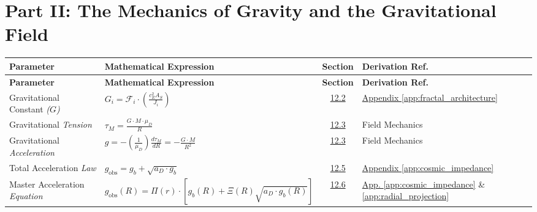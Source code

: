 \vspace{1cm} %

\section*{Part II: The Mechanics of Gravity and the Gravitational Field}

\vspace{0.5cm}
\noindent
\renewcommand{\arraystretch}{1.6}
\begin{longtable}{@{} p{4.5cm} p{6cm} c p{4cm} @{}}
\toprule
\textbf{Parameter} & \textbf{Mathematical Expression} & \textbf{Section} & \textbf{Derivation Ref.} \\
\midrule
\endfirsthead

\toprule
\textbf{Parameter} & \textbf{Mathematical Expression} & \textbf{Section} & \textbf{Derivation Ref.} \\
\midrule
\endhead

Gravitational Constant \newline \textit{($G$)} & $G_i = \mathcal{F}_i \cdot \left( \frac{c_E^2 A_S}{J_i} \right)$ & \hyperref[sec:12.2]{12.2} & \hyperref[app:fractal_architecture]{Appendix \ref*{app:fractal_architecture}} \\

Gravitational \newline \textit{Tension} & $\tau_M = \frac{G \cdot M \cdot \mu_D}{R}$ & \hyperref[sec:12.3]{12.3} & Field Mechanics \\

Gravitational \newline \textit{Acceleration} & $g = - \left(\frac{1}{\mu_D}\right) \frac{d\tau_M}{dR} = -\frac{G \cdot M}{R^2}$ & \hyperref[sec:12.3]{12.3} & Field Mechanics \\

Total Acceleration \newline \textit{Law} & $g_{\text{obs}} = g_b + \sqrt{a_D \cdot g_b}$ & \hyperref[sec:12.5]{12.5} & \hyperref[app:cosmic_impedance]{Appendix \ref*{app:cosmic_impedance}} \\

Master Acceleration \newline \textit{Equation} & $g_{\text{obs}}(R) = \Pi(r) \cdot \left[ g_b(R) + \Xi(R) \sqrt{a_D \cdot g_b(R)} \right]$ & \hyperref[sec:12.6]{12.6} & \hyperref[app:cosmic_impedance]{App. \ref*{app:cosmic_impedance}} \& \hyperref[app:radial_projection]{\ref*{app:radial_projection}} \\


\end{longtable}
